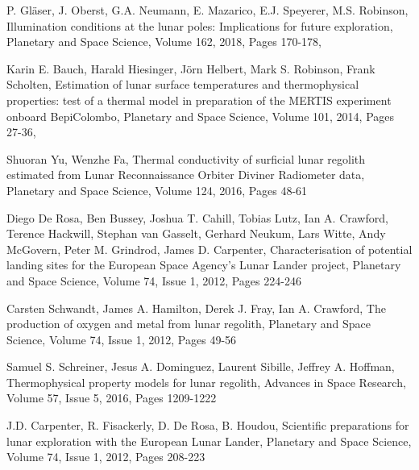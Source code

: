\documentclass[prl,onecolumn]{revtex4-1}  %
\begin{document}
\begin{thebibliography}{99}
P. Gl{\"a}ser, J. Oberst, G.A. Neumann, E. Mazarico, E.J. Speyerer, M.S. Robinson,
Illumination conditions at the lunar poles: Implications for future exploration,
Planetary and Space Science,
Volume 162,
2018,
Pages 170-178,

Karin E. Bauch, Harald Hiesinger, Jörn Helbert, Mark S. Robinson, Frank Scholten,
Estimation of lunar surface temperatures and thermophysical properties: test of a thermal model in preparation of the MERTIS experiment onboard BepiColombo,
Planetary and Space Science,
Volume 101,
2014,
Pages 27-36,

Shuoran Yu, Wenzhe Fa,
Thermal conductivity of surficial lunar regolith estimated from Lunar Reconnaissance Orbiter Diviner Radiometer data,
Planetary and Space Science,
Volume 124,
2016,
Pages 48-61


Diego De Rosa, Ben Bussey, Joshua T. Cahill, Tobias Lutz, Ian A. Crawford, Terence Hackwill, Stephan van Gasselt, Gerhard Neukum, Lars Witte, Andy McGovern, Peter M. Grindrod, James D. Carpenter,
Characterisation of potential landing sites for the European Space Agency's Lunar Lander project,
Planetary and Space Science,
Volume 74, Issue 1,
2012,
Pages 224-246



Carsten Schwandt, James A. Hamilton, Derek J. Fray, Ian A. Crawford,
The production of oxygen and metal from lunar regolith,
Planetary and Space Science,
Volume 74, Issue 1,
2012,
Pages 49-56


Samuel S. Schreiner, Jesus A. Dominguez, Laurent Sibille, Jeffrey A. Hoffman,
Thermophysical property models for lunar regolith,
Advances in Space Research,
Volume 57, Issue 5,
2016,
Pages 1209-1222

J.D. Carpenter, R. Fisackerly, D. De Rosa, B. Houdou,
Scientific preparations for lunar exploration with the European Lunar Lander,
Planetary and Space Science,
Volume 74, Issue 1,
2012,
Pages 208-223

 \end{thebibliography}
\end{document}
